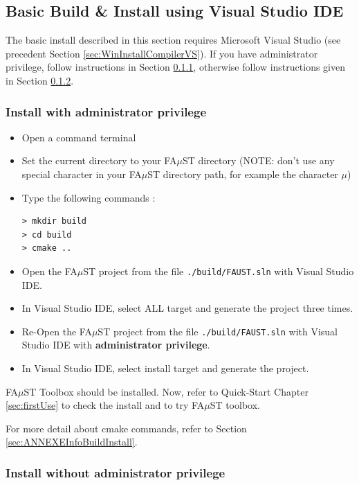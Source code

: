 \subsection{Basic Build \& Install using Visual Studio IDE}\label{sec:WinVisualStudioBasicInstall}
The basic install described in this section requires Microsoft Visual Studio (see precedent Section \ref{sec:WinInstallCompilerVS}).
If you have administrator privilege, follow instructions in Section \ref{sec:AdminWinVisualStudioBasicInstall}, otherwise follow instructions given in Section \ref{sec:NoAdminWinVisualStudioBasicInstall}.

\subsubsection{Install with administrator privilege}
\label{sec:AdminWinVisualStudioBasicInstall}
\begin{itemize}
\item Open a command terminal
\item Set the current directory to your FA$\mu$ST directory (NOTE: don't use any special character in your FA$\mu$ST directory path, for example the character $\mu$)
\item Type the following commands : 
\begin{lstlisting}
> mkdir build
> cd build
> cmake .. 
\end{lstlisting}
\item Open the FA$\mu$ST project from the file \texttt{./build/FAUST.sln} with Visual Studio IDE.
\item In Visual Studio IDE, select ALL target and generate the project three times.
\item Re-Open the FA$\mu$ST project from the file \texttt{./build/FAUST.sln} with Visual Studio IDE with \textbf{administrator privilege}.
\item In Visual Studio IDE, select install target and generate the project.
\end{itemize}

FA$\mu$ST Toolbox should be installed. Now, refer to Quick-Start Chapter \ref{sec:firstUse} to check the install and to try FA$\mu$ST toolbox.

For more detail about cmake commands, refer to Section \ref{sec:ANNEXEInfoBuildInstall}.

 
\subsubsection{Install without administrator privilege}
\label{sec:NoAdminWinVisualStudioBasicInstall}

